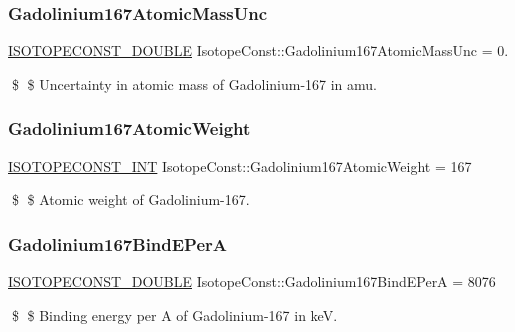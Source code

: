 \subsubsection{\texorpdfstring{Gadolinium167\+Atomic\+Mass\+Unc}{Gadolinium167AtomicMassUnc}}
{\footnotesize\ttfamily \mbox{\hyperlink{group___isotope_const-_macros_ga8f45a7272ce02c0b4c65c44636ed719a}{I\+S\+O\+T\+O\+P\+E\+C\+O\+N\+S\+T\+\_\+\+D\+O\+U\+B\+LE}} Isotope\+Const\+::\+Gadolinium167\+Atomic\+Mass\+Unc = 0.}

\$ \$ Uncertainty in atomic mass of Gadolinium-\/167 in amu. \mbox{\label{group___isotope_const-_gadolinium-_gd167_gaf8c94e1c0bc4484309518c79343f2445}} 
\subsubsection{\texorpdfstring{Gadolinium167\+Atomic\+Weight}{Gadolinium167AtomicWeight}}
{\footnotesize\ttfamily \mbox{\hyperlink{group___isotope_const-_macros_ga5f18360b3e99483a35c32d789e62621c}{I\+S\+O\+T\+O\+P\+E\+C\+O\+N\+S\+T\+\_\+\+I\+NT}} Isotope\+Const\+::\+Gadolinium167\+Atomic\+Weight = 167}

\$ \$ Atomic weight of Gadolinium-\/167. \mbox{\label{group___isotope_const-_gadolinium-_gd167_gad90c89d5a1e7ee63de168ba147d6da30}} 
\subsubsection{\texorpdfstring{Gadolinium167\+Bind\+E\+PerA}{Gadolinium167BindEPerA}}
{\footnotesize\ttfamily \mbox{\hyperlink{group___isotope_const-_macros_ga8f45a7272ce02c0b4c65c44636ed719a}{I\+S\+O\+T\+O\+P\+E\+C\+O\+N\+S\+T\+\_\+\+D\+O\+U\+B\+LE}} Isotope\+Const\+::\+Gadolinium167\+Bind\+E\+PerA = 8076}

\$ \$ Binding energy per A of Gadolinium-\/167 in keV. \mbox{\label{group___isotope_const-_gadolinium-_gd167_ga3b70050425c9618ed0f01223c67e535e}} 
